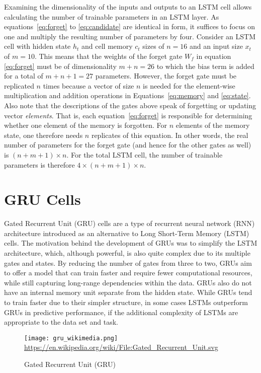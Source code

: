 Examining the dimensionality of the inputs and outputs to an LSTM cell allows calculating the number of trainable parameters in an LSTM layer. As equations~\ref{eq:forget} to \ref{eq:candidate} are identical in form, it suffices to focus on one and multiply the resulting number of parameters by four. Consider an LSTM cell with hidden state $h_t$ and cell memory $c_t$ sizes of $n=16$ and an input size $x_t$ of $m=10$. This means that the weights of the forget gate $W_f$ in equation \ref{eq:forget} must be of dimensionality $m+n=26$ to which the bias term is added for a total of $m+n+1=27$ parameters. However, the forget gate must be replicated $n$ times because a vector of size $n$ is needed for the element-wise multiplication and addition operations in Equations~\ref{eq:memory} and \ref{eq:state}. Also note that the descriptions of the gates above speak of forgetting or updating vector \emph{elements}. That is, each equation~\ref{eq:forget} is responsible for determining whether one element of the memory is forgotten. For $n$ elements of the memory state, one therefore needs $n$ replicates of this equation. In other words, the real number of parameters for the forget gate (and hence for the other gates as well) is $(n+m+1) \times n$. For the total LSTM cell, the number of trainable parameters is therefore $4 \times (n + m + 1) \times n$.


\section{GRU Cells}

Gated Recurrent Unit (GRU) cells are a type of recurrent neural network (RNN) architecture introduced as an alternative to Long Short-Term Memory (LSTM) cells. The motivation behind the development of GRUs was to simplify the LSTM architecture, which, although powerful, is also quite complex due to its multiple gates and states. By reducing the number of gates from three to two, GRUs aim to offer a model that can train faster and require fewer computational resources, while still capturing long-range dependencies within the data. GRUs also do not have an internal memory unit separate from the hidden state. While GRUs tend to train faster due to their simpler structure, in some cases LSTMs outperform GRUs in predictive performance, if the additional complexity of LSTMs are appropriate to the data set and task.

\begin{figure}
\centering

\texttt{[image: gru\_wikimedia.png]}
\scriptsize \url{https://en.wikipedia.org/wiki/File:Gated_Recurrent_Unit.svg} \normalsize
\caption{Gated Recurrent Unit (GRU)}
\label{fig:gru}
\end{figure}

